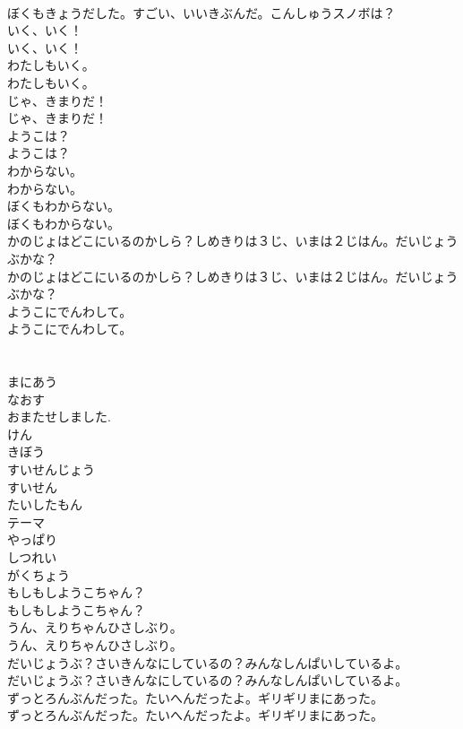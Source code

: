 \documentclass[8pt]{extreport}
\begin{document}
\begin{CJK}{UTF8}{min}
\\	ぼくもきょうだした。すごい、いいきぶんだ。こんしゅうスノボは？
\\	いく、いく！
\\	いく、いく！
\\	わたしもいく。
\\	わたしもいく。
\\	じゃ、きまりだ！
\\	じゃ、きまりだ！
\\	ようこは？
\\	ようこは？
\\	わからない。
\\	わからない。
\\	ぼくもわからない。
\\	ぼくもわからない。
\\	かのじょはどこにいるのかしら？しめきりは３じ、いまは２じはん。だいじょうぶかな？
\\	かのじょはどこにいるのかしら？しめきりは３じ、いまは２じはん。だいじょうぶかな？
\\	ようこにでんわして。
\\	ようこにでんわして。
\\	[でんわをかける・・・]
\\	[でんわをかける・・・]
\\	まにあう
\\	なおす
\\	おまたせしました.
\\	けん
\\	きぼう
\\	すいせんじょう
\\	すいせん
\\	たいしたもん
\\	テーマ
\\	やっぱり
\\	しつれい
\\	がくちょう
\\	もしもしようこちゃん？
\\	もしもしようこちゃん？
\\	うん、えりちゃんひさしぶり。
\\	うん、えりちゃんひさしぶり。
\\	だいじょうぶ？さいきんなにしているの？みんなしんぱいしているよ。
\\	だいじょうぶ？さいきんなにしているの？みんなしんぱいしているよ。
\\	ずっとろんぶんだった。たいへんだったよ。ギリギリまにあった。
\\	ずっとろんぶんだった。たいへんだったよ。ギリギリまにあった。

\end{CJK}
\end{document}
